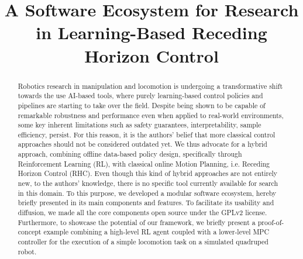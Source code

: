 \documentclass[letterpaper, 10 pt, conference]{ieeeconf}  %
\begin{document}
	
\title{\LARGE \bf
A Software Ecosystem for Research in Learning-Based Receding Horizon Control
}

\author{
}

\maketitle

\begingroup\renewcommand{}
\endgroup

\begingroup\renewcommand{}
\endgroup

\setlength{\textfloatsep}{12.0pt plus 8.0pt minus .0pt}

\begin{abstract}
Robotics research in manipulation and locomotion is undergoing a transformative shift towards the use AI-based tools, where purely learning-based control policies and pipelines are starting to take over the field. Despite being shown to be capable of remarkable robustness and performance even when applied to real-world environments, some key inherent limitations such as safety guarantees, interpretability, sample efficiency, persist. For this reason, it is the authors' belief that more classical control approaches should not be considered outdated yet. We thus advocate for a hybrid approach, combining offline data-based policy design, specifically through Reinforcement Learning (RL), with classical online Motion Planning, i.e. Receding Horizon Control (RHC). Even though this kind of hybrid approaches are not entirely new, to the authors' knowledge, there is no specific tool currently available for search in this domain. To this purpose, we developed a modular software ecosystem, hereby briefly presented in its main components and features. 
To facilitate its usability and diffusion, we made all the core components open source under the GPLv2 license. Furthermore, to showcase the potential of our framework, we briefly present a proof-of-concept example combining a high-level RL agent coupled with a lower-level MPC controller for the execution of a simple locomotion task on a simulated quadruped robot.
\end{abstract}

\IEEEpeerreviewmaketitle


%
%






\end{document}
